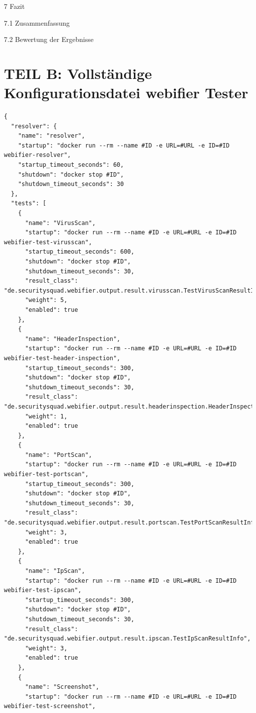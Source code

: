 {7 Fazit}

{7.1 Zusammenfassung}

{7.2 Bewertung der Ergebnisse}

\newpage

\section*{TEIL B: Vollständige Konfigurationsdatei webifier Tester}
\label{app:b}

\begin{scriptsize}
\begin{lstlisting}
{
  "resolver": {
    "name": "resolver",
    "startup": "docker run --rm --name #ID -e URL=#URL -e ID=#ID webifier-resolver",
    "startup_timeout_seconds": 60,
    "shutdown": "docker stop #ID",
    "shutdown_timeout_seconds": 30
  },
  "tests": [
    {
      "name": "VirusScan",
      "startup": "docker run --rm --name #ID -e URL=#URL -e ID=#ID webifier-test-virusscan",
      "startup_timeout_seconds": 600,
      "shutdown": "docker stop #ID",
      "shutdown_timeout_seconds": 30,
      "result_class": "de.securitysquad.webifier.output.result.virusscan.TestVirusScanResultInfo",
      "weight": 5,
      "enabled": true
    },
    {
      "name": "HeaderInspection",
      "startup": "docker run --rm --name #ID -e URL=#URL -e ID=#ID webifier-test-header-inspection",
      "startup_timeout_seconds": 300,
      "shutdown": "docker stop #ID",
      "shutdown_timeout_seconds": 30,
      "result_class": "de.securitysquad.webifier.output.result.headerinspection.HeaderInspectionResultInfo",
      "weight": 1,
      "enabled": true
    },
    {
      "name": "PortScan",
      "startup": "docker run --rm --name #ID -e URL=#URL -e ID=#ID webifier-test-portscan",
      "startup_timeout_seconds": 300,
      "shutdown": "docker stop #ID",
      "shutdown_timeout_seconds": 30,
      "result_class": "de.securitysquad.webifier.output.result.portscan.TestPortScanResultInfo",
      "weight": 3,
      "enabled": true
    },
    {
      "name": "IpScan",
      "startup": "docker run --rm --name #ID -e URL=#URL -e ID=#ID webifier-test-ipscan",
      "startup_timeout_seconds": 300,
      "shutdown": "docker stop #ID",
      "shutdown_timeout_seconds": 30,
      "result_class": "de.securitysquad.webifier.output.result.ipscan.TestIpScanResultInfo",
      "weight": 3,
      "enabled": true
    },
    {
      "name": "Screenshot",
      "startup": "docker run --rm --name #ID -e URL=#URL -e ID=#ID webifier-test-screenshot",

\end{lstlisting}
\end{scriptsize}
